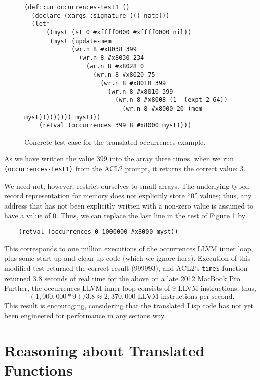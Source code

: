 \documentclass{eptcs}
\begin{document}
\begin{figure*}
\begin{verbatim}
(def::un occurrences-test1 ()
  (declare (xargs :signature (() natp)))
  (let*
      ((myst (st 0 #xffff0000 #xffff0000 nil))
       (myst (update-mem
             (wr.n 8 #x8038 399
               (wr.n 8 #x8030 234
                 (wr.n 8 #x8028 0
                   (wr.n 8 #x8020 75
                     (wr.n 8 #x8018 399
                       (wr.n 8 #x8010 399
                         (wr.n 8 #x8008 (1- (expt 2 64))
                           (wr.n 8 #x8000 20 (mem myst))))))))) myst)))
    (retval (occurrences 399 8 #x8000 myst))))
\end{verbatim}
\hrulefill
\caption{Concrete test case for the translated occurrences example.}
\label{concrete}
\end{figure*}

As we have written the value 399 into the array three times, when we
run \texttt{(occurrences-test1)} from the ACL2 prompt, it returns the
correct value: 3.

We need not, however, restrict ourselves to small arrays.  The
underlying typed record representation for memory does not explicitly
store ``0'' values; thus, any address that has not been explicitly
written with a non-zero value is assumed to have a value of 0.  Thus, 
we can replace the last line in the test of Figure \ref{concrete} by

\begin{verbatim}
    (retval (occurrences 0 1000000 #x8000 myst))
\end{verbatim}

This corresponds to one million executions of the occurrences LLVM inner
loop, plus some start-up and clean-up code (which we ignore here).
Execution of this modified test returned the correct result (999993),
and ACL2's \texttt{time\$} function returned 3.8 seconds of real time for the above on a late
2012 MacBook Pro.  Further, the occurrences LLVM inner loop consists of 9 LLVM
instructions; thus, \[(1,000,000 * 9) / 3.8 \approx 2,370,000 \mbox{ LLVM
instructions per second.}\]  This result is encouraging, considering that
the translated Lisp code has not yet been engineered for performance
in any serious way.

\section{Reasoning about Translated Functions}\label{reasoning}
\end{document}
